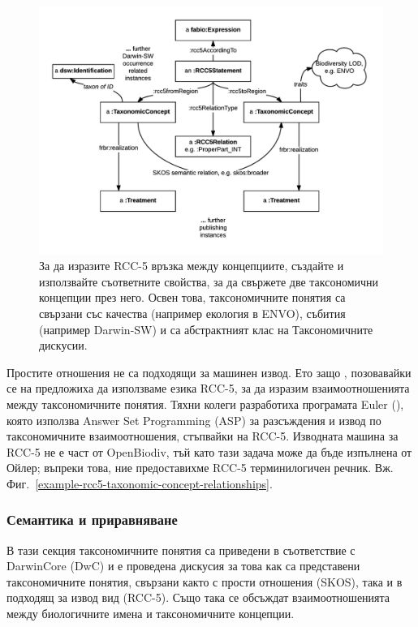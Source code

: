 \begin{figure}[h!]
\centering
  \includegraphics[width=\textwidth]{Figures/taxonomic-concept-relationships-diagram}
  \decoRule
  \caption[Taxonomic concept relationships diagram.]{За да изразите RCC-5 връзка между концепциите, създайте  и използвайте съответните свойства, за да свържете две таксономични концепции през него. Освен това, таксономичните понятия са свързани със качества (например екология в ENVO), събития (например Darwin-SW) и са абстрактният клас на Таксономичните дискусии.}
  \label{taxonomic-concept-relationships-diagram}
\end{figure}

Простите отношения не са подходящи за машинен извод. Ето защо \cite{franz_perspectives:_2009}, позовавайки се на \cite{koperski_referenzliste_2000} предложиха да използваме езика RCC-5, за да изразим взаимоотношенията между таксономичните понятия. Тяхни колеги разработиха програмата Euler (\cite{chen_euler/x:_2014}), която използва Answer Set Programming (ASP) за разсъждения и извод по таксономичните взаимоотношения, стъпвайки на RCC-5. Изводната машина за RCC-5 не е част от OpenBiodiv, тъй като тази задача може да бъде изпълнена от Ойлер; въпреки това, ние предоставихме RCC-5 терминилогичен речник. Вж. Фиг.~\ref{example-rcc5-taxonomic-concept-relationships}.

\subsubsection{Семантика и приравняване}

В тази секция таксономичните понятия са приведени в съответствие с DarwinCore (DwC) и е проведена дискусия за това как са представени таксономичните понятия, свързани както с прости отношения (SKOS), така и в подходящ за извод вид (RCC-5). Също така се обсъждат взаимоотношенията между биологичните имена и таксономичните концепции.


